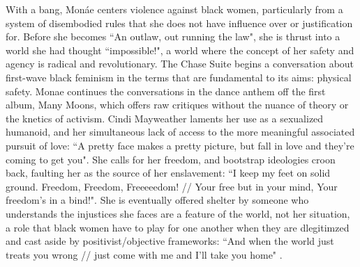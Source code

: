\documentclass[a4paper, 11pt]{article} %
\begin{document}
With a bang, Mon\'ae centers violence against black women, particularly from a system of disembodied rules that she does not have influence over or justification for.
Before she becomes ``An outlaw, out running the law"\cite{neonvalleystreet}, she is thrust into a world she had thought ``impossible!"\cite{happyhunting}, a world where the concept of her safety and agency is radical and revolutionary.
The Chase Suite begins a conversation about first-wave black feminism in the terms that are fundamental to its aims: physical safety.
Monae continues the conversations in the dance anthem off the first album, Many Moons, which offers raw critiques without the nuance of theory or the knetics of activism.
Cindi Mayweather laments her use as a sexualized humanoid, and her simultaneous lack of access to the more meaningful associated pursuit of love: ``A pretty face makes a pretty picture, but fall in love and they're coming to get you"\cite{happyhunting}.
She calls for her freedom, and bootstrap ideologies croon back, faulting her as the source of her enslavement: ``I keep my feet on solid ground. Freedom, Freedom, Freeeeedom! // Your free but in your mind, Your freedom's in a bind!"\cite{manymoons}.
She is eventually offered shelter by someone who understands the injustices she faces are a feature of the world, not her situation, a role that black women have to play for one another when they are dlegitimzed and cast aside by positivist/objective frameworks:
``And when the world just treats you wrong // just come with me and I'll take you home" \cite{manymoons}.
\end{document}
